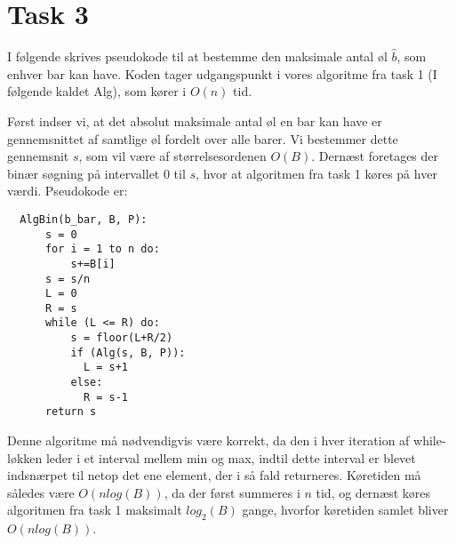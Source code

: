 \section{Task 3}
I følgende skrives pseudokode til at bestemme den maksimale antal øl $\hat{b}$, som enhver bar kan have. Koden tager udgangspunkt i vores algoritme fra task 1 (I følgende kaldet Alg), som kører i $O(n)$ tid.

Først indser vi, at det absolut maksimale antal øl en bar kan have er gennemsnittet af samtlige øl fordelt over alle barer. Vi bestemmer dette gennemsnit $s$, som vil være af størrelsesordenen $O(B)$.
Dernæst foretages der binær søgning på intervallet $0$ til $s$, hvor at algoritmen fra task 1 køres på hver værdi. Pseudokode er:\\

\begin{lstlisting}
  AlgBin(b_bar, B, P):
      s = 0
      for i = 1 to n do:
          s+=B[i]
      s = s/n
      L = 0
      R = s
      while (L <= R) do:
          s = floor(L+R/2)
          if (Alg(s, B, P)):
            L = s+1
          else:
            R = s-1
      return s
\end{lstlisting}

Denne algoritme må nødvendigvis være korrekt, da den i hver iteration af while-løkken leder i et interval mellem min og max, indtil 
dette interval er blevet indsnærpet til netop det ene element, der i så fald returneres. 
Køretiden må således være $O(nlog(B))$, da der først summeres i $n$ tid, og dernæst køres algoritmen fra task 1 maksimalt $log_2(B)$ gange, 
hvorfor køretiden samlet bliver $O(nlog(B))$.

